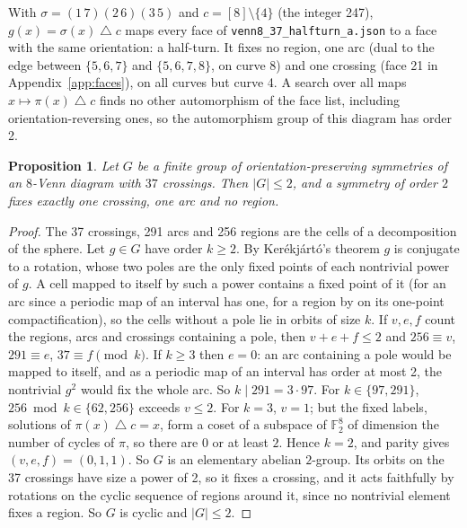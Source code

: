 \documentclass[11pt]{article}
\newtheorem{proposition}[theorem]{Proposition}
\theoremstyle{remark}
\begin{document}
With $\sigma=(1\,7)(2\,6)(3\,5)$ and $c=[8]\setminus\{4\}$ (the integer 247), $g(x)=\sigma(x)\mathbin{\triangle}c$
maps every face of \texttt{venn8\_37\_halfturn\_a.json} to a face with the same orientation: a half-turn. It fixes no
region, one arc (dual to the edge between $\{5,6,7\}$ and $\{5,6,7,8\}$, on curve 8) and one crossing (face 21 in
Appendix~\ref{app:faces}), on all curves but curve 4. A search over all maps $x\mapsto\pi(x)\mathbin{\triangle}c$
finds no other automorphism of the face list, including orientation-reversing ones, so the automorphism group of
this diagram has order 2.

\begin{proposition}\label{prop:rot}
Let $G$ be a finite group of orientation-preserving symmetries of an $8$-Venn diagram with $37$ crossings. Then
$|G|\le2$, and a symmetry of order $2$ fixes exactly one crossing, one arc and no region.
\end{proposition}

\begin{proof}
The 37 crossings, 291 arcs and 256 regions are the cells of a decomposition of the sphere. Let $g\in G$ have order
$k\ge2$. By Ker\'ekj\'art\'o's theorem \cite{CK} $g$ is conjugate to a rotation, whose two poles are the only fixed
points of each nontrivial power of $g$. A cell mapped to itself by such a power contains a fixed point of it (for an
arc since a periodic map of an interval has one, for a region by \cite{CK} on its one-point compactification), so
the cells without a pole lie in orbits of size $k$. If $v,e,f$ count the regions, arcs and crossings containing a
pole, then $v+e+f\le2$ and $256\equiv v$, $291\equiv e$, $37\equiv f\pmod k$. If $k\ge3$ then $e=0$: an arc containing
a pole would be mapped to itself, and as a periodic map of an interval has order at most 2, the nontrivial $g^2$
would fix the whole arc. So $k\mid291=3\cdot97$. For
$k\in\{97,291\}$, $256\bmod k\in\{62,256\}$ exceeds $v\le2$. For $k=3$, $v=1$; but the fixed labels, solutions of
$\pi(x)\mathbin{\triangle}c=x$, form a coset of a subspace of $\mathbb{F}_2^8$ of dimension the number of cycles of
$\pi$, so there are $0$ or at least $2$. Hence $k=2$, and parity gives $(v,e,f)=(0,1,1)$. So $G$ is an elementary
abelian $2$-group. Its orbits on the 37 crossings have size a power of 2, so it fixes a crossing, and it acts
faithfully by rotations on the cyclic sequence of regions around it, since no nontrivial element fixes a region.
So $G$ is cyclic and $|G|\le2$.
\end{proof}
\end{document}
